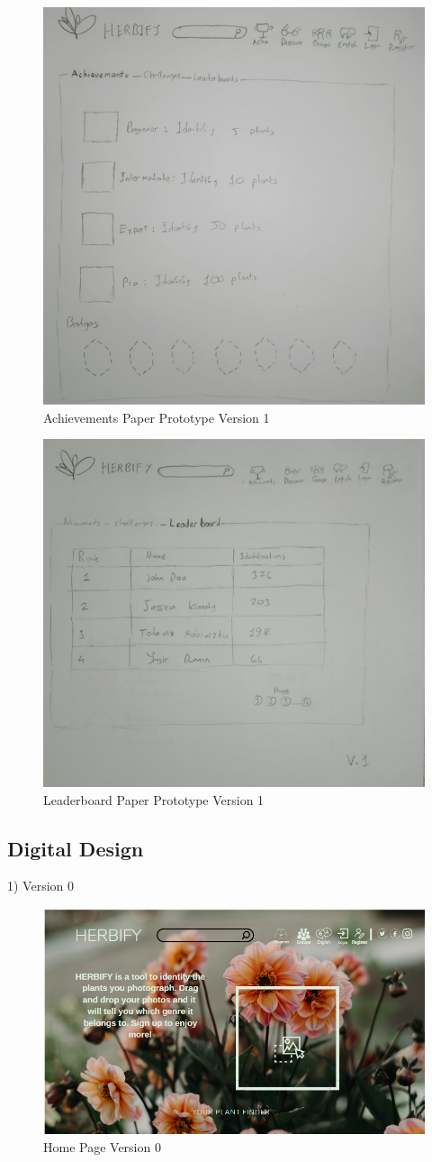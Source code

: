 \documentclass[conference]{IEEEtran}
\begin{document}
\begin{figure}[H]
\centerline{\includegraphics[width=0.48 \textwidth]{images/achivements-pp1.png}}
\caption{Achievements Paper Prototype Version 1}
\label{fig:graph1}
\end{figure}



\begin{figure}[H]
\centerline{\includegraphics[width=0.48 \textwidth]{images/leaderboard-pp1.png}}
\caption{Leaderboard Paper Prototype Version 1}
\label{fig:graph1}
\end{figure}


\subsection{Digital Design}

1) Version 0

\begin{figure}[H]
\centerline{\includegraphics[width=0.48 \textwidth]{images/homev0(identification).png}}
\caption{Home Page Version 0}
\label{fig:graph1}
\end{figure}
\end{document}
